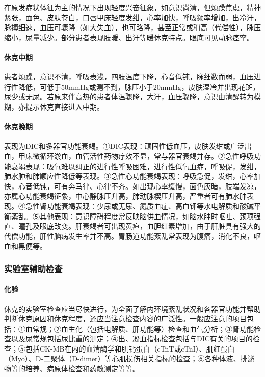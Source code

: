 在原发症状体征为主的情况下出现轻度兴奋征象，如意识尚清，但烦躁焦虑，精神紧张，面色、皮肤苍白，口唇甲床轻度发绀，心率加快，呼吸频率增加，出冷汗，脉搏细速，血压可骤降（如大失血），也可略降，甚至正常或稍高（代偿性），脉压缩小，尿量减少。部分患者表现肢暖、出汗等暖休克特点。眼底可见动脉痉挛。

\paragraph{休克中期}

患者烦躁，意识不清，呼吸表浅，四肢温度下降，心音低钝，脉细数而弱，血压进行性降低，可低于50mmHg或测不到，脉压小于20mmHg，皮肤湿冷并出现花斑，尿少或无尿。若原来伴高热的患者体温骤降，大汗，血压骤降，意识由清醒转为模糊，亦提示休克直接进入中期。

\paragraph{休克晚期}

表现为DIC和多器官功能衰竭。①DIC表现：顽固性低血压，皮肤发绀或广泛出血，甲床微循环淤血，血管活性药物疗效不显，常与器官衰竭并存。②急性呼吸功能衰竭表现：吸氧难以纠正的进行性呼吸困难，进行性低氧血症，呼吸促，发绀，肺水肿和肺顺应性降低等表现。③急性心功能衰竭表现：呼吸急促，发绀，心率加快，心音低钝，可有奔马律、心律不齐。如出现心率缓慢，面色灰暗，肢端发凉，亦属心功能衰竭征象，中心静脉压升高，肺动脉楔压升高，严重者可有肺水肿表现。④急性肾功能衰竭表现：少尿或无尿、氮质血症、高血钾等水电解质和酸碱平衡紊乱。⑤其他表现：意识障碍程度常反映脑供血情况，如脑水肿时呕吐、颈项强直、瞳孔及眼底改变。肝衰竭者可出现黄疸，血胆红素增加，由于肝脏具有强大的代偿功能，肝性脑病发生率并不高。胃肠道功能紊乱常表现为腹痛，消化不良，呕血和黑便等。

\subsubsection{实验室辅助检查}

\paragraph{化验}

休克的实验室检查应当尽快进行，为全面了解内环境紊乱状况和各器官功能并帮助判断休克原因和休克程度，还应当注意检查内容的广泛性。一般应注意的项目包括：①血常规；②血生化（包括电解质、肝功能等）检查和血气分析；③肾功能检查以及尿常规包括尿比重的测定；④出、凝血指标检查包括与DIC有关的项目的检查；⑤包括CK-MB在内的血清酶学和肌钙蛋白（cTnT或cTnI）、肌红蛋白（Myo）、D-二聚体（D-dimer）等心肌损伤相关指标的检查；⑥各种体液、排泌物等的培养、病原体检查和药敏测定等等。

